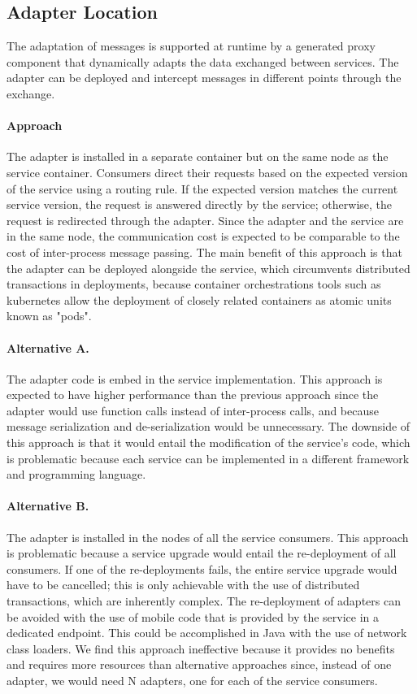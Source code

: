\subsection{Adapter Location} %
\label{sec:adapter_location}

The adaptation of messages is supported at runtime by a generated proxy component
that dynamically adapts the data exchanged between services.
The adapter can be deployed and intercept messages in different points through the exchange.

\paragraph{Approach}
The adapter is installed in a separate container but on the same node as the service container.
Consumers direct their requests based on the expected version of the service using a routing rule.
If the expected version matches the current service version, the request is answered directly by the service;
otherwise, the request is redirected through the adapter.
Since the adapter and the service are in the same node, the communication cost is expected to be comparable to the cost of inter-process message passing.
The main benefit of this approach is that the adapter can be deployed alongside the service,
which circumvents distributed transactions in deployments,
because container orchestrations tools such as kubernetes allow the deployment of closely related containers as atomic units known as "pods".

\paragraph{Alternative A.}
The adapter code is embed in the service implementation.
This approach is expected to have higher performance than the previous approach since
the adapter would use function calls instead of inter-process calls, and because message serialization and de-serialization would be unnecessary.
The downside of this approach is that it would entail the modification of the service's code, which is problematic because each service can be implemented in a different framework and programming language.

\paragraph{Alternative B.}
The adapter is installed in the nodes of all the service consumers.
This approach is problematic because a service upgrade would entail the re-deployment of all consumers.
If one of the re-deployments fails, the entire service upgrade would have to be cancelled;
this is only achievable with the use of distributed transactions, which are inherently complex.
The re-deployment of adapters can be avoided with the use of mobile code that is provided by the service in a dedicated endpoint.
This could be accomplished in Java with the use of network class loaders.
We find this approach ineffective because it provides no benefits and requires more resources than alternative approaches since,
instead of one adapter, we would need N adapters, one for each of the service consumers.

